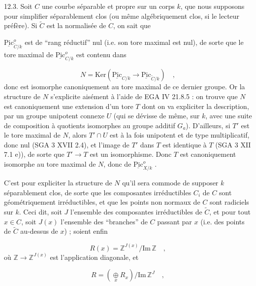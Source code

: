 12.3. Soit $C$ une courbe séparable et propre sur un corps $k$, que nous supposons pour simplifier séparablement clos (ou même algébriquement clos, si le lecteur préfère). Si $\widetilde{C}$ est la normalisée de $C$, on sait que



$\underline{\mathrm{Pic}}^o_{\widetilde{C}/k}$ est de ``rang réductif'' nul (i.e. son tore maximal est nul), de sorte que le tore maximal de $\underline{\mathrm{Pic}}^o_{C/k}$ est contenu dans

\begin{equation*}
N = \mathrm{Ker}(\underline{\mathrm{Pic}}_{C/k} \longrightarrow \underline{\mathrm{Pic}}_{\widetilde{C}/k}) \quad ,
\end{equation*}
donc est isomorphe canoniquement au tore maximal de ce dernier groupe. Or la structure de $N$ s'explicite aisément à l'aide de EGA IV 21.8.5 : on trouve que $N$ est canoniquement une extension d'un tore $T$ dont on va expliciter la description, par un groupe unipotent connexe $U$ (qui se dévisse de même, sur $k$, avec une suite de composition à quotients isomorphes au groupe additif $G_a$). D'ailleurs, si $T'$ est le tore maximal de $N$, alors $T' \cap U$ est à la fois unipotent et de type multiplicatif, donc nul (SGA 3 XVII 2.4), et l'image de $T'$ dans $T$ est identique à $T$ (SGA 3 XII 7.1 e)), de sorte que $T' \longrightarrow T$ est un isomorphisme. Donc $T$ est canoniquement isomorphe au tore maximal de $N$, donc de $\underline{\mathrm{Pic}}^o_{X/k}$ .

C'est pour expliciter la structure de $N$ qu'il sera commode de supposer $k$ séparablement clos, de sorte que les composantes irréductibles $C_i$ de $C$ sont géométriquement irréductibles, et que les points non normaux de $C$ sont radiciels sur $k$. Ceci dit, soit $J$ l'ensemble des composantes irréductibles de $\widetilde{C}$, et pour tout $x \in C$, soit $J(x)$ l'ensemble des ``branches'' de $C$ passant par $x$ (i.e. des points de $\widetilde{C}$ au-dessus de $x$) ; soient enfin

\begin{equation}\tag{12.3.1}
R(x) = \mathbb{Z}^{J(x)}/\mathrm{Im}\,\mathbb{Z} \quad ,
\end{equation}
où $\mathbb{Z} \longrightarrow \mathbb{Z}^{J(x)}$ est l'application diagonale, et

\begin{equation}\tag{12.3.2}
R = (\mathop{\oplus}\limits_{x} R_x)/\mathrm{Im}\,\mathbb{Z}^J \quad ,
\end{equation}

